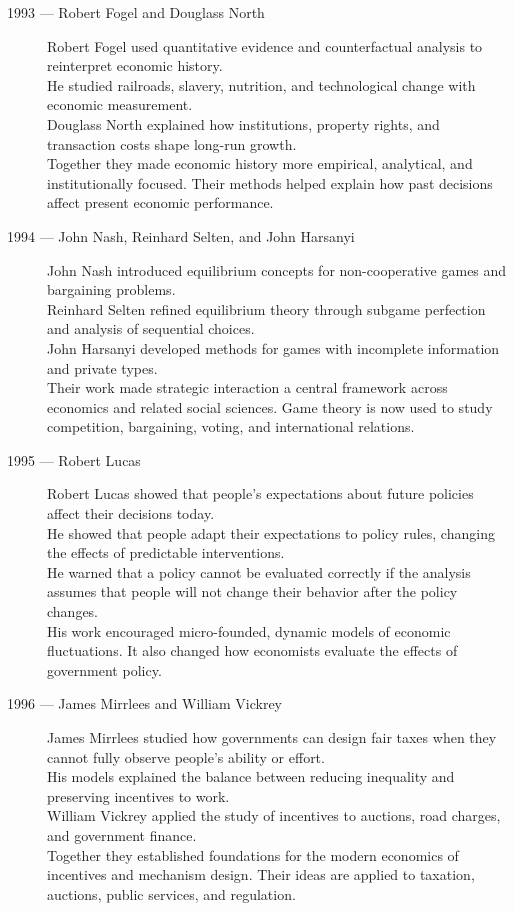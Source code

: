 \documentclass[12pt]{report}
\begin{document}
{\begin{description}
\item[1993 --- Robert Fogel and Douglass North]
Robert Fogel used quantitative evidence and counterfactual analysis to reinterpret economic history.\\
He studied railroads, slavery, nutrition, and technological change with economic measurement.\\
Douglass North explained how institutions, property rights, and transaction costs shape long-run growth.\\
Together they made economic history more empirical, analytical, and institutionally focused. Their methods helped explain how past decisions affect present economic performance.

\item[1994 --- John Nash, Reinhard Selten, and John Harsanyi]
John Nash introduced equilibrium concepts for non-cooperative games and bargaining problems.\\
Reinhard Selten refined equilibrium theory through subgame perfection and analysis of sequential choices.\\
John Harsanyi developed methods for games with incomplete information and private types.\\
Their work made strategic interaction a central framework across economics and related social sciences. Game theory is now used to study competition, bargaining, voting, and international relations.

\item[1995 --- Robert Lucas]
Robert Lucas showed that people's expectations about future policies affect their decisions today.\\
He showed that people adapt their expectations to policy rules, changing the effects of predictable interventions.\\
He warned that a policy cannot be evaluated correctly if the analysis assumes that people will not change their behavior after the policy changes.\\
His work encouraged micro-founded, dynamic models of economic fluctuations. It also changed how economists evaluate the effects of government policy.

\item[1996 --- James Mirrlees and William Vickrey]
James Mirrlees studied how governments can design fair taxes when they cannot fully observe people's ability or effort.\\
His models explained the balance between reducing inequality and preserving incentives to work.\\
William Vickrey applied the study of incentives to auctions, road charges, and government finance.\\
Together they established foundations for the modern economics of incentives and mechanism design. Their ideas are applied to taxation, auctions, public services, and regulation.


\end{description}}
\end{document}
